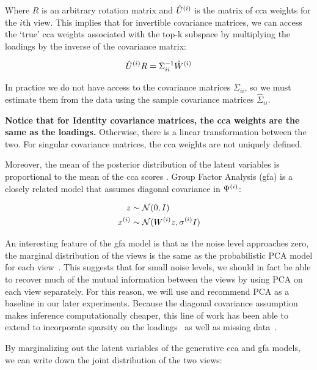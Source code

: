 Where $R$ is an arbitrary rotation matrix and $\hat{U}^{(i)}$ is the matrix of \acrshort{cca} weights for the $i$th view.
This implies that for invertible covariance matrices, we can access the `true' \acrshort{cca} weights associated with the top-k subspace by multiplying the \gls{loadings} by the inverse of the covariance matrix:

\begin{align}
    \hat{U}^{(i)}R = \Sigma_{ii}^{-1} \hat{W}^{(i)}
\end{align}

In practice we do not have access to the covariance matrices $\Sigma_{ii}$, so we must estimate them from the data using the sample covariance matrices $\hat{\Sigma}_{ii}$.

\textbf{Notice that for Identity covariance matrices, the \acrshort{cca} weights are the same as the loadings.}
Otherwise, there is a linear transformation between the two.
For singular covariance matrices, the \acrshort{cca} weights are not uniquely defined.

Moreover, the mean of the posterior distribution of the latent variables is proportional to the mean of the \acrshort{cca} scores \citep{klami2013bayesian}.
Group Factor Analysis (\acrshort{gfa}) is a closely related model that assumes diagonal covariance in $\Psi^{(i)}$:

\begin{align}
    z& \sim \mathcal{N}(0, I)\\
    x^{(i)} & \sim \mathcal{N}(W^{(i)} z, \sigma^{(i)}I)
\end{align}

An interesting feature of the \acrshort{gfa} model is that as the noise level approaches zero, the marginal distribution of the views is the same as the probabilistic PCA model for each view~\citep{tipping1999probabilistic}.
This suggests that for small noise levels, we should in fact be able to recover much of the mutual information between the views by using PCA on each view separately.
For this reason, we will use and recommend PCA as a baseline in our later experiments.
Because the diagonal covariance assumption makes inference computationally cheaper, this line of work has been able to extend to incorporate sparsity on the loadings~\citep{virtanen2011bayesian} as well as missing data~\citep{ferreira2022hierarchical}.

By marginalizing out the latent variables of the generative \acrshort{cca} and \acrshort{gfa} models, we can write down the joint distribution of the two views:


